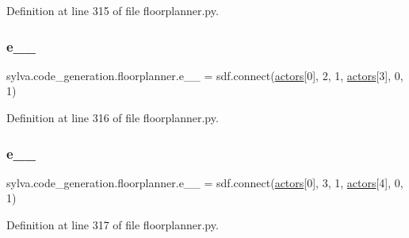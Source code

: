 Definition at line 315 of file floorplanner.\+py.

\mbox{\label{namespacesylva_1_1code__generation_1_1floorplanner_a740fbbb3665774229de5901a905956e3}} 
\subsubsection{\texorpdfstring{e\+\_\+\_}{e\_0\_3}}
{\footnotesize\ttfamily sylva.\+code\+\_\+generation.\+floorplanner.\+e\+\_\+\_ = sdf.\+connect(\hyperlink{namespacesylva_1_1code__generation_1_1floorplanner_a0a7a26c9bd92be126f3b70c232ba81cd}{actors}\mbox{[}0\mbox{]}, 2, 1, \hyperlink{namespacesylva_1_1code__generation_1_1floorplanner_a0a7a26c9bd92be126f3b70c232ba81cd}{actors}\mbox{[}3\mbox{]}, 0, 1)}



Definition at line 316 of file floorplanner.\+py.

\mbox{\label{namespacesylva_1_1code__generation_1_1floorplanner_ac2626a5caf5c6013a91b1419aa074ab3}} 
\subsubsection{\texorpdfstring{e\+\_\+\_}{e\_0\_4}}
{\footnotesize\ttfamily sylva.\+code\+\_\+generation.\+floorplanner.\+e\+\_\+\_ = sdf.\+connect(\hyperlink{namespacesylva_1_1code__generation_1_1floorplanner_a0a7a26c9bd92be126f3b70c232ba81cd}{actors}\mbox{[}0\mbox{]}, 3, 1, \hyperlink{namespacesylva_1_1code__generation_1_1floorplanner_a0a7a26c9bd92be126f3b70c232ba81cd}{actors}\mbox{[}4\mbox{]}, 0, 1)}



Definition at line 317 of file floorplanner.\+py.

\mbox{\label{namespacesylva_1_1code__generation_1_1floorplanner_a92c433eef06542906df49706094bfe57}} 
